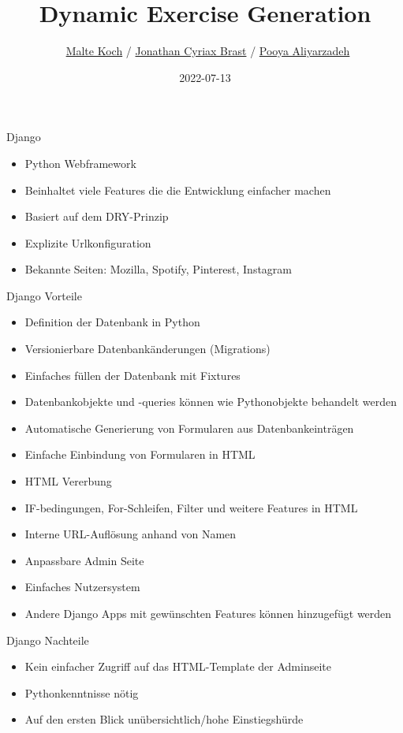 \documentclass[english,hangout]{beamer}
\title{Dynamic Exercise Generation}
\subtitle{}
\author{\
  \href{mailto:malte.koch@stud.fra-uas.de}{Malte Koch} /
  \href{mailto:cyriax.brast@stud.fra-uas.de}{Jonathan Cyriax Brast} /
  \href{mailto:ooya.aliyarzadeh@gmail.com}{Pooya Aliyarzadeh}
}
\institute{Frankfurt University of Applied Sciences\\
           Faculty of Computer Science and Engineering}
\date{2022-07-13}
\begin{document}
\begin{frame}
\titlepage
\end{frame}

\begin{frame}{Django}
\begin{itemize}
 \item Python Webframework
 \item Beinhaltet viele Features die die Entwicklung einfacher machen
 \item Basiert auf dem DRY-Prinzip
 \item Explizite Urlkonfiguration
 \item Bekannte Seiten\footnotemark: Mozilla, Spotify, Pinterest, Instagram
\end{itemize}
\end{frame}

\begin{frame}{Django Vorteile}
\begin{itemize}
 \item Definition der Datenbank in Python
 \item Versionierbare Datenbankänderungen (Migrations)
 \item Einfaches füllen der Datenbank mit Fixtures
 \item Datenbankobjekte und -queries können wie Pythonobjekte behandelt werden
 \item Automatische Generierung von Formularen aus Datenbankeinträgen
 \item Einfache Einbindung von Formularen in HTML
 \item HTML Vererbung
 \item IF-bedingungen, For-Schleifen, Filter und weitere Features in HTML
 \item Interne URL-Auflösung anhand von Namen
 \item Anpassbare Admin Seite
 \item Einfaches Nutzersystem
 \item Andere Django Apps mit gewünschten Features können hinzugefügt werden
\end{itemize}
\end{frame}

\begin{frame}{Django Nachteile}
\begin{itemize}
 \item Kein einfacher Zugriff auf das HTML-Template der Adminseite
 \item Pythonkenntnisse nötig
 \item Auf den ersten Blick unübersichtlich/hohe Einstiegshürde
\end{itemize}
\end{frame}
\end{document}
